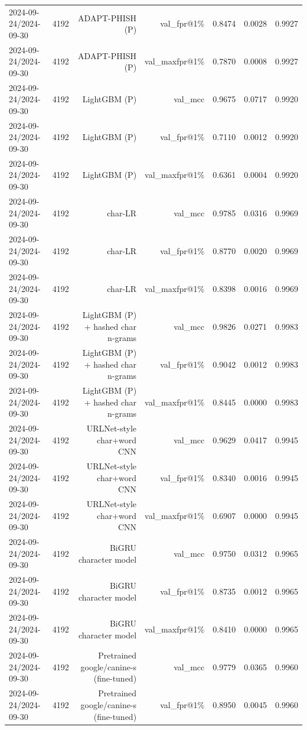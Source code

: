 \begin{table}[t]
\begin{tabular}{llrrrrr}
2024-09-24/2024-09-30 & 4192 & ADAPT-PHISH (P) & val\_fpr@1\% & 0.8474 & 0.0028 & 0.9927 \\
2024-09-24/2024-09-30 & 4192 & ADAPT-PHISH (P) & val\_maxfpr@1\% & 0.7870 & 0.0008 & 0.9927 \\
2024-09-24/2024-09-30 & 4192 & LightGBM (P) & val\_mcc & 0.9675 & 0.0717 & 0.9920 \\
2024-09-24/2024-09-30 & 4192 & LightGBM (P) & val\_fpr@1\% & 0.7110 & 0.0012 & 0.9920 \\
2024-09-24/2024-09-30 & 4192 & LightGBM (P) & val\_maxfpr@1\% & 0.6361 & 0.0004 & 0.9920 \\
2024-09-24/2024-09-30 & 4192 & char-LR & val\_mcc & 0.9785 & 0.0316 & 0.9969 \\
2024-09-24/2024-09-30 & 4192 & char-LR & val\_fpr@1\% & 0.8770 & 0.0020 & 0.9969 \\
2024-09-24/2024-09-30 & 4192 & char-LR & val\_maxfpr@1\% & 0.8398 & 0.0016 & 0.9969 \\
2024-09-24/2024-09-30 & 4192 & LightGBM (P) + hashed char n-grams & val\_mcc & 0.9826 & 0.0271 & 0.9983 \\
2024-09-24/2024-09-30 & 4192 & LightGBM (P) + hashed char n-grams & val\_fpr@1\% & 0.9042 & 0.0012 & 0.9983 \\
2024-09-24/2024-09-30 & 4192 & LightGBM (P) + hashed char n-grams & val\_maxfpr@1\% & 0.8445 & 0.0000 & 0.9983 \\
2024-09-24/2024-09-30 & 4192 & URLNet-style char+word CNN & val\_mcc & 0.9629 & 0.0417 & 0.9945 \\
2024-09-24/2024-09-30 & 4192 & URLNet-style char+word CNN & val\_fpr@1\% & 0.8340 & 0.0016 & 0.9945 \\
2024-09-24/2024-09-30 & 4192 & URLNet-style char+word CNN & val\_maxfpr@1\% & 0.6907 & 0.0000 & 0.9945 \\
2024-09-24/2024-09-30 & 4192 & BiGRU character model & val\_mcc & 0.9750 & 0.0312 & 0.9965 \\
2024-09-24/2024-09-30 & 4192 & BiGRU character model & val\_fpr@1\% & 0.8735 & 0.0012 & 0.9965 \\
2024-09-24/2024-09-30 & 4192 & BiGRU character model & val\_maxfpr@1\% & 0.8410 & 0.0000 & 0.9965 \\
2024-09-24/2024-09-30 & 4192 & Pretrained google/canine-s (fine-tuned) & val\_mcc & 0.9779 & 0.0365 & 0.9960 \\
2024-09-24/2024-09-30 & 4192 & Pretrained google/canine-s (fine-tuned) & val\_fpr@1\% & 0.8950 & 0.0045 & 0.9960 \\

\end{tabular}
\end{table}
